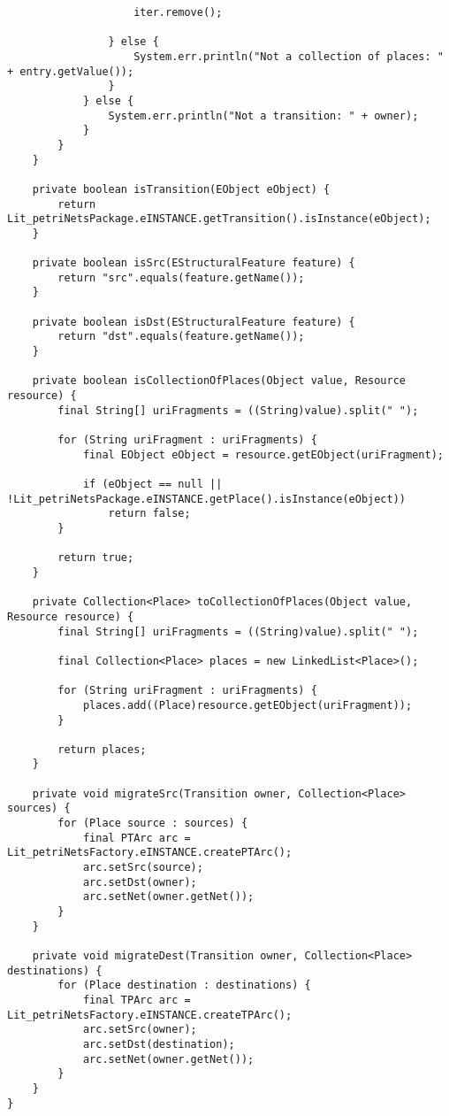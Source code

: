 \begin{lstlisting}
					iter.remove();
				
				} else {
					System.err.println("Not a collection of places: " + entry.getValue());
				}
			} else {
				System.err.println("Not a transition: " + owner);
			}
		}
	}

	private boolean isTransition(EObject eObject) {
		return Lit_petriNetsPackage.eINSTANCE.getTransition().isInstance(eObject);
	}
	
	private boolean isSrc(EStructuralFeature feature) {
		return "src".equals(feature.getName());
	}
	
	private boolean isDst(EStructuralFeature feature) {
		return "dst".equals(feature.getName());
	}
	
	private boolean isCollectionOfPlaces(Object value, Resource resource) {
		final String[] uriFragments = ((String)value).split(" ");
		
		for (String uriFragment : uriFragments) {
			final EObject eObject = resource.getEObject(uriFragment);
			
			if (eObject == null || !Lit_petriNetsPackage.eINSTANCE.getPlace().isInstance(eObject))
				return false;
		}
		
		return true;
	}
	
	private Collection<Place> toCollectionOfPlaces(Object value, Resource resource) {
		final String[] uriFragments = ((String)value).split(" ");
		
		final Collection<Place> places = new LinkedList<Place>();
		
		for (String uriFragment : uriFragments) {
			places.add((Place)resource.getEObject(uriFragment));
		}
		
		return places;
	}
	
	private void migrateSrc(Transition owner, Collection<Place> sources) {
		for (Place source : sources) {
			final PTArc arc = Lit_petriNetsFactory.eINSTANCE.createPTArc();
			arc.setSrc(source);
			arc.setDst(owner);
			arc.setNet(owner.getNet());
		}
	}
	
	private void migrateDest(Transition owner, Collection<Place> destinations) {
		for (Place destination : destinations) {
			final TPArc arc = Lit_petriNetsFactory.eINSTANCE.createTPArc();
			arc.setSrc(owner);
			arc.setDst(destination);
			arc.setNet(owner.getNet());
		}
	}
}
\end{lstlisting}

